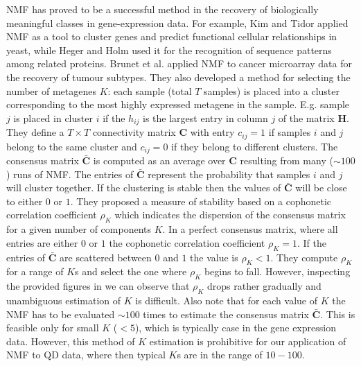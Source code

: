 NMF has proved to be a successful method in the recovery of biologically meaningful classes in gene-expression data. For example, Kim and Tidor \cite{Kim2003} applied NMF as a tool to cluster genes and predict functional cellular relationships in yeast, while Heger and Holm \cite{Heger2003} used it for the recognition of sequence patterns among related proteins. Brunet et al. \cite{Brunet2004} applied NMF to cancer microarray data for the recovery of tumour subtypes. They also developed a method for selecting the number of metagenes $K$: each sample (total $T$ samples) is placed into a cluster corresponding to the most highly expressed metagene in the sample. E.g. sample $j$ is placed in cluster $i$ if the $h_{ij}$ is the largest entry in column $j$ of the matrix $\bm{H}$. They define a $T\times T$ connectivity matrix $\bm{C}$ with entry $c_{ij}=1$ if samples $i$ and $j$ belong to the same cluster and $c_{ij}=0$ if they belong to different clusters. The consensus matrix $\bar{\bm{C}}$ is computed as an average over $\bm{C}$ resulting from many ($\sim100$) runs of NMF. The entries of $\bar{\bm{C}}$ represent the probability that samples $i$ and $j$ will cluster together. If the clustering is stable then the values of $\bar{\bm{C}}$ will be close to either $0$ or $1$. They proposed a measure of stability based on a cophonetic correlation coefficient $\rho_K$ which indicates the dispersion of the consensus matrix for a given number of components $K$. In a perfect consensus matrix, where all entries are either $0$ or $1$ the cophonetic correlation coefficient $\rho_K=1$. If the entries of $\bar{\bm{C}}$ are scattered between $0$ and $1$ the value is $\rho_K<1$. They compute $\rho_K$ for a range of $K$s and select the one where $\rho_K$ begins to fall. However, inspecting the provided figures in \cite{Brunet2004} we can observe that $\rho_K$ drops rather gradually and unambiguous estimation of $K$ is difficult. Also note that for each value of $K$ the NMF has to be evaluated $\sim 100$ times to  estimate the consensus matrix $\bar{\bm{C}}$. This is feasible only for small $K$ ($<5$), which is typically case in the gene expression data. However, this method of $K$ estimation is prohibitive for our application of NMF to QD data, where then typical $K$s are in the range of $10-100$.

